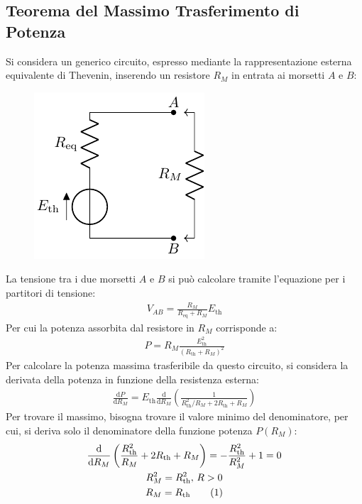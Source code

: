 \documentclass{article}
\newcommand{\df}{\mathrm{d}}
\newcommand{\tageq}{\tag{\stepcounter{equation}\theequation}}
\numberwithin{equation}{subsection}
\begin{document}
\subsection{Teorema del Massimo Trasferimento di Potenza}

Si considera un generico circuito, espresso mediante la rappresentazione esterna equivalente di Thevenin, inserendo un resistore $R_M$ in entrata ai morsetti $A$ e $B$:
\begin{figure}[H]%
    \centering
    \includegraphics{rappresentazione-thevenin-carico.pdf}%
    \label{fig:rappresentazione-thevenin-carico}
\end{figure}
La tensione tra i due morsetti $A$ e $B$ si può calcolare tramite l'equazione per i partitori di tensione:
\begin{gather*}
    V_{AB}=\displaystyle\frac{R_M}{R_\mathrm{eq}+R_M}E_\mathrm{th}
\end{gather*}
Per cui la potenza assorbita dal resistore in $R_M$ corrisponde a:
\begin{gather*}
    P=R_M\displaystyle\frac{E_\mathrm{th}^2}{(R_\mathrm{th}+R_M)^2}
\end{gather*}
Per calcolare la potenza massima trasferibile da questo circuito, si considera la derivata della potenza in funzione della resistenza esterna:
\begin{gather*}
    \displaystyle\frac{\df P}{\df R_M}=E_\mathrm{th}\frac{\df}{\df R_M}\left(\frac{1}{{R_\mathrm{th}^2}/{R_M}+2R_\mathrm{th}+R_M}\right)
\end{gather*}
Per trovare il massimo, bisogna trovare il valore minimo del denominatore, per cui, si deriva solo il denominatore della funzione potenza $P(R_M)$:
\begin{gather*}
    \displaystyle\frac{\df}{\df R_M}\left(\frac{R_\mathrm{th}^2}{R_M}+2R_\mathrm{th}+R_M\right)=-\frac{R_\mathrm{th}^2}{R_M^2}+1=0\\
    R_M^2=R_\mathrm{th}^2,\,R>0\\
    R_M=R_\mathrm{th}\tageq
\end{gather*}
\end{document}

